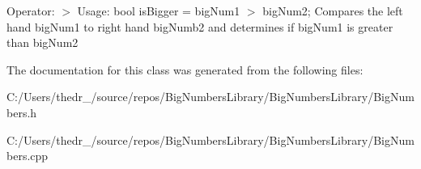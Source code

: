 Operator\+: $>$ Usage\+: bool is\+Bigger = big\+Num1 $>$ big\+Num2; Compares the left hand big\+Num1 to right hand big\+Numb2 and determines if big\+Num1 is greater than big\+Num2 

The documentation for this class was generated from the following files\+:\begin{DoxyCompactItemize}
\item 
C\+:/\+Users/thedr\+\_/source/repos/\+Big\+Numbers\+Library/\+Big\+Numbers\+Library/Big\+Numbers.\+h\item 
C\+:/\+Users/thedr\+\_/source/repos/\+Big\+Numbers\+Library/\+Big\+Numbers\+Library/Big\+Numbers.\+cpp\end{DoxyCompactItemize}
